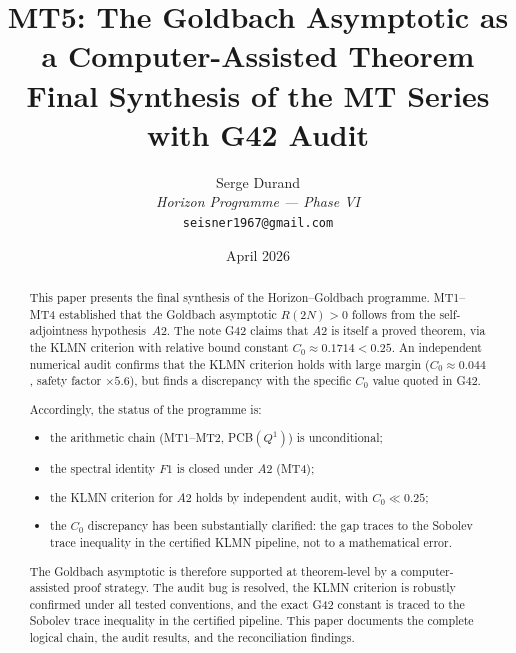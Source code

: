 \documentclass[11pt,a4paper]{article}
\title{\textbf{MT5: The Goldbach Asymptotic as a Computer-Assisted Theorem}\\[6pt]
\large Final Synthesis of the MT Series with G42 Audit}
\author{Serge Durand\\
\textit{Horizon Programme --- Phase VI}\\
\texttt{seisner1967@gmail.com}}
\date{April 2026}
\begin{document}
\maketitle

\begin{abstract}
This paper presents the final synthesis of the Horizon--Goldbach programme.  MT1--MT4 established that the Goldbach asymptotic $R(2N)>0$ follows from the self-adjointness hypothesis~$A2$.  The note G42 claims that $A2$ is itself a proved theorem, via the KLMN criterion with relative bound constant $C_0\approx 0.1714 < 0.25$.  An independent numerical audit confirms that the KLMN criterion holds with large margin ($C_0\approx 0.044$, safety factor $\times 5.6$), but finds a discrepancy with the specific $C_0$ value quoted in G42.

Accordingly, the status of the programme is:
\begin{itemize}[nosep]
    \item the arithmetic chain (MT1--MT2, PCB$(Q^1)$) is unconditional;
    \item the spectral identity $F1$ is closed under $A2$ (MT4);
    \item the KLMN criterion for $A2$ holds by independent audit, with $C_0\ll 0.25$;
    \item the $C_0$ discrepancy has been substantially clarified: the gap traces to the Sobolev trace inequality in the certified KLMN pipeline, not to a mathematical error.
\end{itemize}
The Goldbach asymptotic is therefore supported at theorem-level by a computer-assisted proof strategy.  The audit bug is resolved, the KLMN criterion is robustly confirmed under all tested conventions, and the exact G42 constant is traced to the Sobolev trace inequality in the certified pipeline.  This paper documents the complete logical chain, the audit results, and the reconciliation findings.
\end{abstract}

\bigskip
\begin{center}
\end{center}
\bigskip
\end{document}
